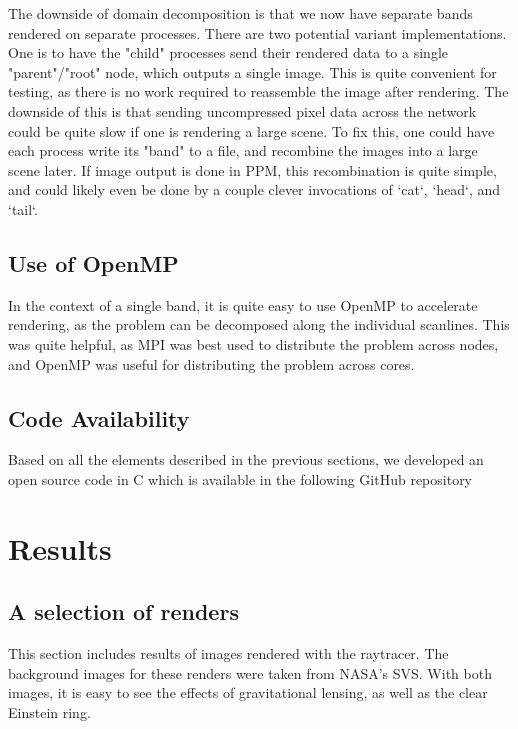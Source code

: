 The downside of domain decomposition is that we now have separate bands rendered on separate processes. There are two potential variant implementations. One is to have the "child" processes send their rendered data to a single "parent"/"root" node, which outputs a single image. This is quite convenient for testing, as there is no work required to reassemble the image after rendering. The downside of this is that sending uncompressed pixel data across the network could be quite slow if one is rendering a large scene. To fix this, one could have each process write its "band" to a file, and recombine the images into a large scene later. If image output is done in PPM, this recombination is quite simple, and could likely even be done by a couple clever invocations of `cat`, `head`, and `tail`.


\subsection {Use of OpenMP}
In the context of a single band, it is quite easy to use OpenMP \cite{660313_OMP} to accelerate rendering, as the problem can be decomposed along the individual scanlines. This was quite helpful, as MPI was best used to distribute the problem across nodes, and OpenMP was useful for distributing the problem across cores. 


\subsection{Code Availability}
Based on all the elements described in the previous sections,
we developed an open source code in C which is available in the following
GitHub repository




\section{Results}
\label{sec:results}

\subsection {A selection of renders}

This section includes results of images rendered with the raytracer. The background images for these renders were taken from NASA's SVS. With both images, it is easy to see the effects of gravitational lensing, as well as the clear Einstein ring. 


